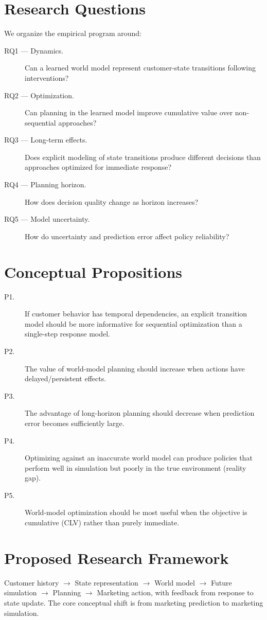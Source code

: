 \documentclass[11pt]{article}
\begin{document}
\section{Research Questions}
We organize the empirical program around:
\begin{description}
\item[RQ1 --- Dynamics.] Can a learned world model represent customer-state transitions following interventions?
\item[RQ2 --- Optimization.] Can planning in the learned model improve cumulative value over non-sequential approaches?
\item[RQ3 --- Long-term effects.] Does explicit modeling of state transitions produce different decisions than approaches optimized for immediate response?
\item[RQ4 --- Planning horizon.] How does decision quality change as horizon increases?
\item[RQ5 --- Model uncertainty.] How do uncertainty and prediction error affect policy reliability?
\end{description}

\section{Conceptual Propositions}
\begin{description}
\item[P1.] If customer behavior has temporal dependencies, an explicit transition model should be more informative for sequential optimization than a single-step response model.
\item[P2.] The value of world-model planning should increase when actions have delayed/persistent effects.
\item[P3.] The advantage of long-horizon planning should decrease when prediction error becomes sufficiently large.
\item[P4.] Optimizing against an inaccurate world model can produce policies that perform well in simulation but poorly in the true environment (reality gap).
\item[P5.] World-model optimization should be most useful when the objective is cumulative (CLV) rather than purely immediate.
\end{description}

\section{Proposed Research Framework}
Customer history $\rightarrow$ State representation $\rightarrow$ World model $\rightarrow$ Future simulation $\rightarrow$ Planning $\rightarrow$ Marketing action, with feedback from response to state update. The core conceptual shift is from marketing prediction to marketing simulation.
\end{document}
